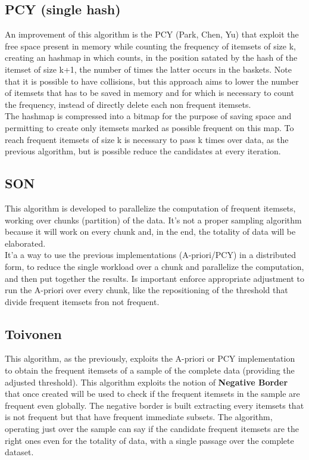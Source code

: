 \documentclass[14pt]{extarticle}
\begin{document}
\subsection{PCY (single hash)}
An improvement of this algorithm is the PCY (Park, Chen, Yu) that exploit the free space present in memory while counting the frequency of itemsets of size k, creating an hashmap in which counts, in the position satated by the hash of the itemset of size k+1, the number of times the latter occurs in the baskets. Note that it is possible to have collisions, but this approach aims to lower the number of itemsets that has to be saved in memory and for which is necessary to count the frequency, instead of directly delete each non frequent itemsets.\\
The hashmap is compressed into a bitmap for the purpose of saving space and permitting to create only itemsets marked as possible frequent on this map. To reach frequent itemsets of size k is necessary to pass k times over data, as the previous algorithm, but is possible reduce the candidates at every iteration. 
\subsection{SON}
This algorithm is developed to parallelize the computation of frequent itemsets, working over chunks (partition) of the data. It's not a proper sampling algorithm because it will work on every chunk and, in the end, the totality of data will be elaborated.\\
It'a a way to use the previous implementations (A-priori/PCY) in a distributed form, to reduce the single workload over a chunk and parallelize the computation, and then put together the results. Is important enforce appropriate adjustment to run the A-priori over every chunk, like the repositioning of the threshold that divide frequent itemsets fron not frequent.\\
\subsection{Toivonen}
This algorithm, as the previously, exploits the A-priori or PCY implementation to obtain the frequent itemsets of a sample of the complete data (providing the adjusted threshold). This algorithm exploits the notion of \textbf{Negative Border} that once created will be used to check if the frequent itemsets in the sample are frequent even globally. The negative border is built extracting every itemsets that is not frequent but that have frequent immediate subsets. The algorithm, operating just over the sample can say if the candidate frequent itemsets are the right ones even for the totality of data, with a single passage over the complete dataset.
\end{document}

